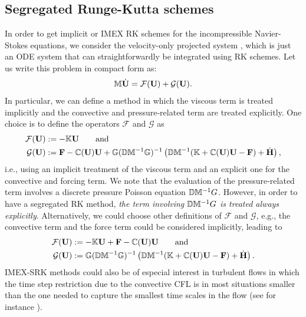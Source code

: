 \subsection{Segregated Runge-Kutta schemes}

In order to get implicit or IMEX RK schemes for the incompressible Navier-Stokes equations, we consider the velocity-only projected system , which is just an ODE system that can straightforwardly be integrated using RK schemes. Let us write this problem in compact form as:
\begin{equation}
\label{eq-C6_NS_galerkin_mat1_ope}
\mathbb{M}\dot{{\bf U}}=\mathcal{F}({\bf U})+\mathcal{G}({\bf U}).
\end{equation}
In particular, we can define a method in which the viscous term is treated implicitly and the convective and pressure-related term are treated explicitly. One choice is to define the operators $\mathcal{F}$ and $\mathcal{G}$ as 
\begin{align}
\label{eq-C6_oper_def}
\mathcal{F}({\bf U}) &:=-\mathbb{K}{\bf U}\quad\quad\mbox{and}\\
 \mathcal{G}({\bf U})&:= 
 {\bf F} - \mathbb{C}({\bf U}){\bf U} + \mathbb{G}(\mathbb{D}\mathbb{M}^{-1}\mathbb{G})^{-1} \left( \mathbb{D}\mathbb{M}^{-1}(\mathbb{K}+\mathbb{C}({\bf U}){\bf U} - {\bf F})+ \dot{\bf{H}} \right),
\end{align}
i.e., using an implicit treatment of the viscous term and an explicit one for the convective and forcing term. We note that the evaluation of the pressure-related term involves a discrete pressure Poisson equation $\mathbb{D}\mathbb{M}^{-1}G$.  However, in order to have a segregated RK method, \emph{the term involving $\mathbb{D}\mathbb{M}^{-1}G$ is treated always explicitly}. Alternatively, we could choose other definitions of $\mathcal{F}$ and $\mathcal{G}$, e.g., %
the convective term and the force term could be considered implicitly, leading to 
\begin{align}
\label{eq-C6_oper_def2}
\mathcal{F}({\bf U}) &:=-\mathbb{K}{\bf U} + {\bf F} - \mathbb{C}({\bf U}){\bf U} \quad\quad\mbox{and}\\
 \mathcal{G}({\bf U})&:=  \mathbb{G}(\mathbb{D}\mathbb{M}^{-1}\mathbb{G})^{-1} \left( \mathbb{D}\mathbb{M}^{-1}(\mathbb{K}+\mathbb{C}({\bf U}){\bf U} - {\bf F})+ \dot{\bf{H}} \right).
\end{align} 
IMEX-SRK methods could also be of especial interest in turbulent flows in which the time step restriction due to the convective CFL is in most situations smaller than the one needed to capture the smallest time scales in the flow (see for instance \cite{verstappen_symmetry-preserving_2003,vreman_comparison_2014}). 

